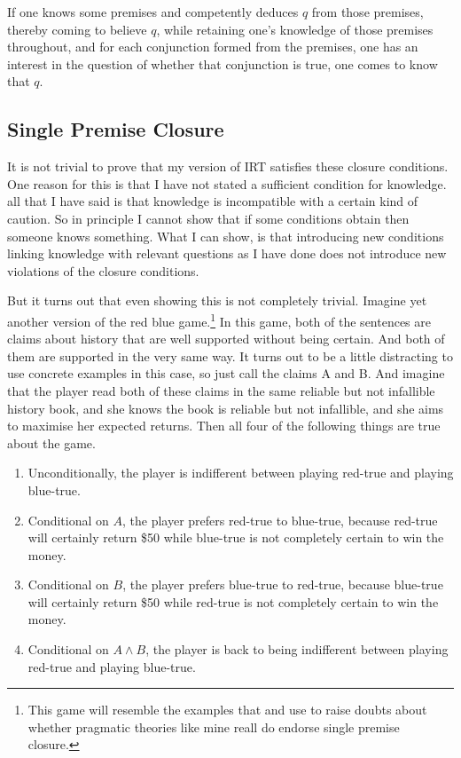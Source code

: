 \documentclass[11pt,]{book}
\providecommand{\tightlist}{%
  \setlength{\itemsep}{0pt}\setlength{\parskip}{0pt}}
\let\rmarkdownfootnote\footnote%
\def\footnote{\protect\rmarkdownfootnote}
\begin{document}
\begin{description}
\tightlist
\item[Relevant Multiple Premise Closure]
If one knows some premises and competently deduces \(q\) from those premises, thereby coming to believe \(q\), while retaining one's knowledge of those premises throughout, and for each conjunction formed from the premises, one has an interest in the question of whether that conjunction is true, one comes to know that \(q\).
\end{description}

\hypertarget{andelim}{%
\subsection{Single Premise Closure}\label{andelim}}

It is not trivial to prove that my version of IRT satisfies these closure conditions. One reason for this is that I have not stated a sufficient condition for knowledge. all that I have said is that knowledge is incompatible with a certain kind of caution. So in principle I cannot show that if some conditions obtain then someone knows something. What I can show, is that introducing new conditions linking knowledge with relevant questions as I have done does not introduce new violations of the closure conditions.

But it turns out that even showing this is not completely trivial. Imagine yet another version of the red blue game.\footnote{This game will resemble the examples that \citet{Zweber2017} and \citet{AndersonHawthorne2019b} use to raise doubts about whether pragmatic theories like mine reall do endorse single premise closure.} In this game, both of the sentences are claims about history that are well supported without being certain. And both of them are supported in the very same way. It turns out to be a little distracting to use concrete examples in this case, so just call the claims A and B. And imagine that the player read both of these claims in the same reliable but not infallible history book, and she knows the book is reliable but not infallible, and she aims to maximise her expected returns. Then all four of the following things are true about the game.

\begin{enumerate}
\def\labelenumi{\arabic{enumi}.}
\tightlist
\item
  Unconditionally, the player is indifferent between playing red-true and playing blue-true.
\item
  Conditional on \(A\), the player prefers red-true to blue-true, because red-true will certainly return \$50 while blue-true is not completely certain to win the money.
\item
  Conditional on \(B\), the player prefers blue-true to red-true, because blue-true will certainly return \$50 while red-true is not completely certain to win the money.
\item
  Conditional on \(A \wedge B\), the player is back to being indifferent between playing red-true and playing blue-true.
\end{enumerate}
\end{document}
